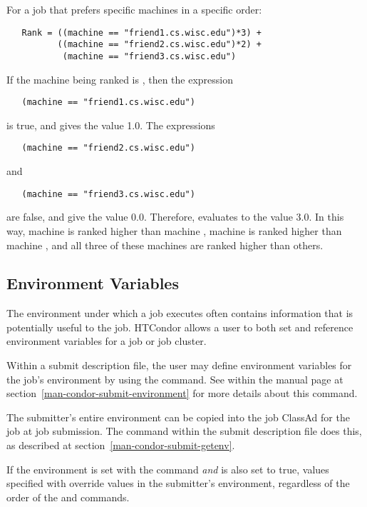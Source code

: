 For a job that prefers specific machines in a specific order:
\begin{verbatim}
   Rank = ((machine == "friend1.cs.wisc.edu")*3) +
          ((machine == "friend2.cs.wisc.edu")*2) +
           (machine == "friend3.cs.wisc.edu")
\end{verbatim}
If the machine being ranked is , then the
expression
\begin{verbatim}
   (machine == "friend1.cs.wisc.edu")
\end{verbatim}
is true, and gives the value 1.0.
The expressions
\begin{verbatim}
   (machine == "friend2.cs.wisc.edu")
\end{verbatim}
and
\begin{verbatim}
   (machine == "friend3.cs.wisc.edu")
\end{verbatim}
are false, and give the value 0.0.
Therefore,  evaluates to the value 3.0.
In this way, machine  is ranked higher than
machine ,
machine 
is ranked higher than 
machine ,
and all three of these machines are ranked higher than others.



\subsection{Environment Variables}

The environment under which a job executes often contains
information that is potentially useful to the job.
HTCondor allows a user to both set and reference environment
variables for a job or job cluster.

Within a submit description file, the user may define environment
variables for the job's environment by using the 
 command.
See within the  manual page at
section~\ref{man-condor-submit-environment} for more details about this command.

The submitter's entire environment can be copied into the job
ClassAd for the job at job submission.
The  command within the submit description file
does this,
as described at section~\ref{man-condor-submit-getenv}.

If the environment is set with the  command \emph{and}
 is also set to true, values specified with
 override values in the submitter's environment,
regardless of the order of the  and 
commands.

